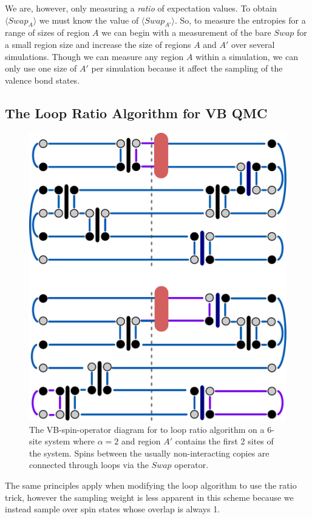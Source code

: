\documentclass[prb,aps,twocolumn,floatfix,amsmath,amssymb,superscriptaddress,tightenlines]{revtex4}
\begin{document}
We are, however, only measuring a {\it ratio} of expectation values.
To obtain $ \langle Swap_A \rangle $ we must know the value of $ \langle Swap_{A'} \rangle $.
So, to measure the entropies for a range of sizes of region $A$ we can begin with a measurement of the bare $Swap$ for a small region size and increase the size of regions $A$ and $A'$ over several simulations.
Though we can measure any region $A$ within a simulation, we can only use one size of  $A'$ per simulation because it affect the sampling of the valence bond states.






\subsection{The Loop Ratio Algorithm for VB QMC}

\begin{figure} {
\includegraphics[width=2.8 in]{loopalgratio.pdf} \caption{ 
\label{lratio} %
The VB-spin-operator diagram for to loop ratio algorithm on a 6-site system where $\alpha =2$ and region $A'$ contains the first 2 sites of the system.
Spins between the usually non-interacting copies are connected through loops via the $Swap$ operator.
}
} \end{figure}

The same principles apply when modifying the loop algorithm to use the ratio trick, however the sampling weight is less apparent in this scheme because we instead sample over spin states whose overlap is always 1.
\end{document}
